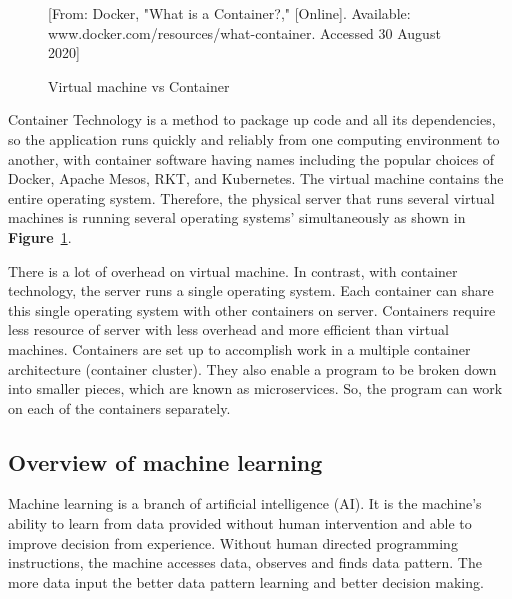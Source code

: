 \documentclass[12pt,oneside,openright,a4paper]{cpe-english-project}
\begin{document}
\begin{figure}[!h]\centering
  \setlength{\fboxrule}{0mm} %
  \setlength{\fboxsep}{0cm}
  \caption{Virtual machine vs Container}\label{fig:vmVSContainer}
  [From: Docker, "What is a Container?," [Online]. Available: www.docker.com/resources/what-container. Accessed 30 August 2020]
\end{figure}

Container Technology is a method to package up code and all its dependencies, so the application runs quickly and reliably from one computing environment to another, with container software having names including the popular choices of Docker, Apache Mesos, RKT, and Kubernetes.  The virtual machine contains the entire operating system.  Therefore, the physical server that runs several virtual machines is running several operating systems’ simultaneously as shown in \textbf{Figure}~\ref{fig:vmVSContainer}. \cite{docker}

There is a lot of overhead on virtual machine.  In contrast, with container technology, the server runs a single operating system.  Each container can share this single operating system with other containers on server.  Containers require less resource of server with less overhead and more efficient than virtual machines. \cite{container}   Containers are set up to accomplish work in a multiple container architecture (container cluster).  They also enable a program to be broken down into smaller pieces, which are known as microservices.  So, the program can work on each of the containers separately.

\subsection{Overview of machine learning}
Machine learning is a branch of artificial intelligence (AI).  It is the machine’s ability to learn from data provided without human intervention and able to improve decision from experience.  Without human directed programming instructions, the machine accesses data, observes and finds data pattern.  The more data input the better data pattern learning and better decision making.\cite{ml}
\end{document}
